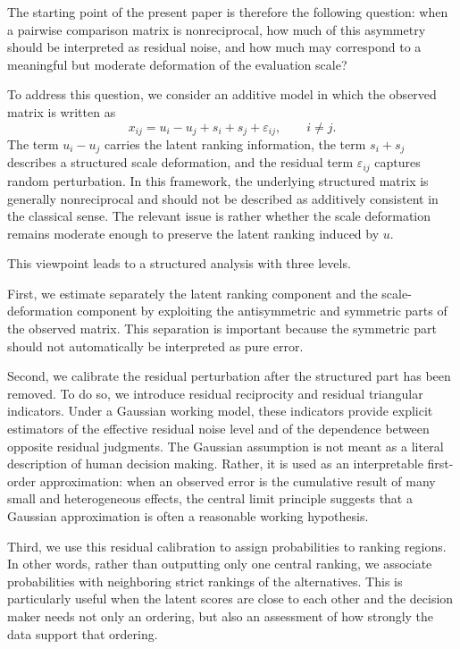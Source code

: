 \documentclass[11pt]{amsart}
\theoremstyle{definition}
\theoremstyle{plain}
\numberwithin{equation}{section}
\begin{document}
The starting point of the present paper is therefore the following question: when a pairwise comparison matrix is nonreciprocal, how much of this asymmetry should be interpreted as residual noise, and how much may correspond to a meaningful but moderate deformation of the evaluation scale?

To address this question, we consider an additive model in which the observed matrix is written as
\[
x_{ij}=u_i-u_j+s_i+s_j+\varepsilon_{ij},
\qquad i\neq j.
\]
The term $u_i-u_j$ carries the latent ranking information, the term $s_i+s_j$ describes a structured scale deformation, and the residual term $\varepsilon_{ij}$ captures random perturbation. In this framework, the underlying structured matrix is generally nonreciprocal and should not be described as additively consistent in the classical sense. The relevant issue is rather whether the scale deformation remains moderate enough to preserve the latent ranking induced by $u$.

This viewpoint leads to a structured analysis with three levels.

First, we estimate separately the latent ranking component and the scale-deformation component by exploiting the antisymmetric and symmetric parts of the observed matrix. This separation is important because the symmetric part should not automatically be interpreted as pure error.

Second, we calibrate the residual perturbation after the structured part has been removed. To do so, we introduce residual reciprocity and residual triangular indicators. Under a Gaussian working model, these indicators provide explicit estimators of the effective residual noise level and of the dependence between opposite residual judgments. The Gaussian assumption is not meant as a literal description of human decision making. Rather, it is used as an interpretable first-order approximation: when an observed error is the cumulative result of many small and heterogeneous effects, the central limit principle suggests that a Gaussian approximation is often a reasonable working hypothesis.

Third, we use this residual calibration to assign probabilities to ranking regions. In other words, rather than outputting only one central ranking, we associate probabilities with neighboring strict rankings of the alternatives. This is particularly useful when the latent scores are close to each other and the decision maker needs not only an ordering, but also an assessment of how strongly the data support that ordering.
\end{document}
